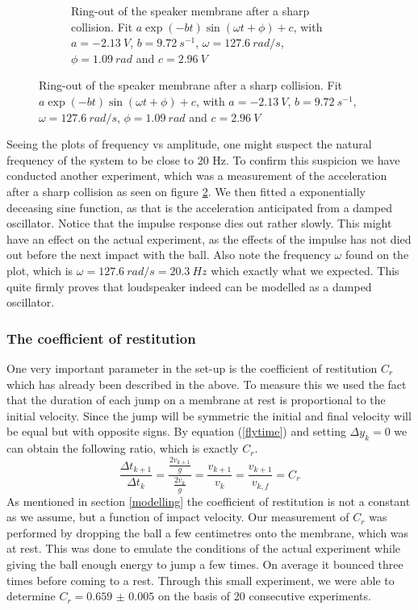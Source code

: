 \documentclass[12pt,oneside,a4paper]{article}
\numberwithin{equation}{section}
\begin{document}
{{{{\begin{figure}[h]
\begin{subfigure}[t]{0.49\textwidth}
		\caption{Ring-out of the speaker membrane after a sharp collision. Fit $a\exp(-bt)\sin(\omega t + \phi)+c$, with $a=\SI{-2.13}{V}$, $b=\SI{9.72}{s^{-1}}$, $\omega=\SI{127.6}{rad/s}$, $\phi=\SI{1.09}{rad}$ and $c=\SI{2.96}{V}$}
		\label{ringout}
	\end{subfigure}
\end{figure}
Seeing the plots of frequency vs amplitude, one might suspect the natural frequency of the system to be close to 20 Hz. To confirm this suspicion we have conducted another experiment, which was a measurement of the acceleration after a sharp collision as seen on figure \ref{ringout}. We then fitted a exponentially deceasing sine function, as that is the acceleration anticipated from a damped oscillator. Notice that the impulse response dies out rather slowly. This might have an effect on the actual experiment, as the effects of the impulse has not died out before the next impact with the ball. Also note the frequency $\omega$ found on the plot, which is $\omega = \SI{127.6}{rad/s} = \SI{20.3}{Hz}$ which exactly what we expected. This quite firmly proves that loudspeaker indeed can be modelled as a damped oscillator.
\subsubsection{The coefficient of restitution}
One very important parameter in the set-up is the coefficient of restitution 
$C_r$ which has already been described in the above. To measure this we used 
the fact that the duration of each jump on a membrane at rest is proportional 
to the initial velocity. Since the jump will be symmetric the initial and 
final velocity will be equal but with opposite signs. By equation 
(\ref{flytime}) and setting $\Delta y_k=0$ we can obtain the following ratio, 
which is exactly $C_r$.
\begin{equation}
	\frac{\Delta t_{k+1}}{\Delta t_{k}}= \frac{\frac{2v_{k+1}}{g}}{\frac{2v_{k}}{g}} = \frac{v_{k+1}}{v_k} = \frac{v_{k+1}}{v_{k,f}} = C_r
\end{equation}
As mentioned in section \ref{modelling} the coefficient of restitution is not a 
constant as we assume, but a function of impact velocity. Our measurement of 
$C_r$ was performed by dropping the ball a few centimetres onto the membrane, 
which was at rest. This was done to emulate the conditions of the actual 
experiment while giving the ball enough energy to jump a few times. On average 
it bounced three times before coming to a rest. Through this small experiment, 
we were able to determine $C_r= \num{0.659(5)}$ on the basis of 20 consecutive 
experiments. 

}}}}
\end{document}
